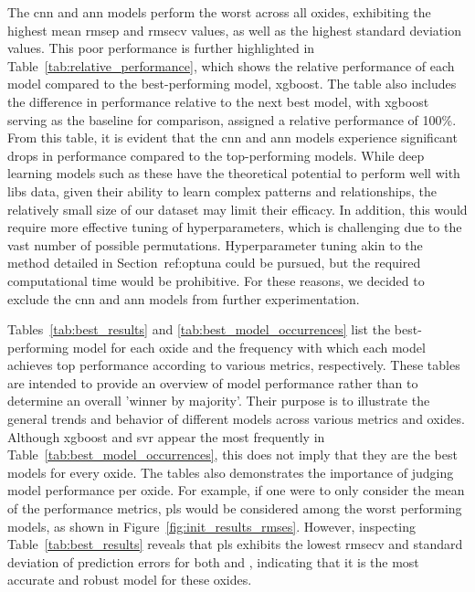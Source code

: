 The \gls{cnn} and \gls{ann} models perform the worst across all oxides, exhibiting the highest mean \gls{rmsep} and \gls{rmsecv} values, as well as the highest standard deviation values.
This poor performance is further highlighted in Table~\ref{tab:relative_performance}, which shows the relative performance of each model compared to the best-performing model, \gls{xgboost}.
The table also includes the difference in performance relative to the next best model, with \gls{xgboost} serving as the baseline for comparison, assigned a relative performance of 100\%.
From this table, it is evident that the \gls{cnn} and \gls{ann} models experience significant drops in performance compared to the top-performing models.
While deep learning models such as these have the theoretical potential to perform well with \gls{libs} data, given their ability to learn complex patterns and relationships, the relatively small size of our dataset may limit their efficacy.
In addition, this would require more effective tuning of hyperparameters, which is challenging due to the vast number of possible permutations.
Hyperparameter tuning akin to the method detailed in Section~{ref:optuna} could be pursued, but the required computational time would be prohibitive.
For these reasons, we decided to exclude the \gls{cnn} and \gls{ann} models from further experimentation.

Tables~\ref{tab:best_results} and \ref{tab:best_model_occurrences} list the best-performing model for each oxide and the frequency with which each model achieves top performance according to various metrics, respectively.
These tables are intended to provide an overview of model performance rather than to determine an overall 'winner by majority'.
Their purpose is to illustrate the general trends and behavior of different models across various metrics and oxides.
Although \gls{xgboost} and \gls{svr} appear the most frequently in Table~\ref{tab:best_model_occurrences}, this does not imply that they are the best models for every oxide.
The tables also demonstrates the importance of judging model performance per oxide.
For example, if one were to only consider the mean of the performance metrics, \gls{pls} would be considered among the worst performing models, as shown in Figure~\ref{fig:init_results_rmses}.
However, inspecting Table~\ref{tab:best_results} reveals that \gls{pls} exhibits the lowest \gls{rmsecv} and standard deviation of prediction errors for both  and , indicating that it is the most accurate and robust model for these oxides.

